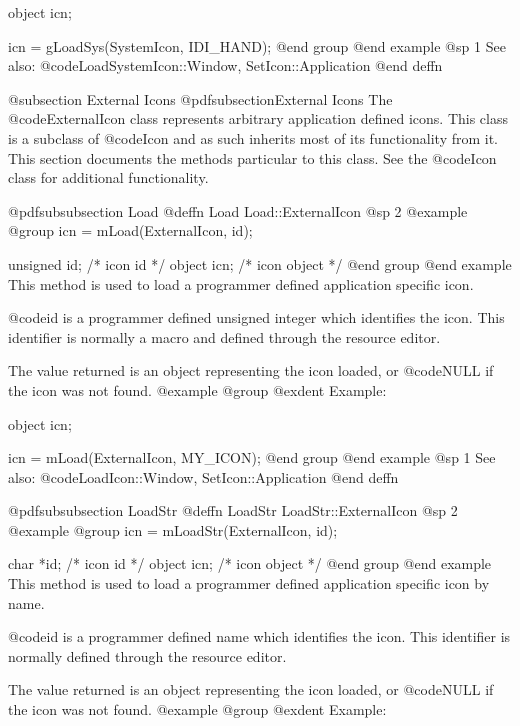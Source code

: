 object  icn;

icn = gLoadSys(SystemIcon, IDI_HAND);
@end group
@end example
@sp 1
See also:  @code{LoadSystemIcon::Window, SetIcon::Application}
@end deffn





@subsection External Icons
@pdfsubsection{External Icons}
The @code{ExternalIcon} class represents arbitrary application defined
icons.  This class is a subclass of @code{Icon} and as such inherits
most of its functionality from it.  This section documents the methods
particular to this class.  See the @code{Icon} class for additional
functionality.






@pdfsubsubsection {Load}
@deffn {Load} Load::ExternalIcon
@sp 2
@example
@group
icn = mLoad(ExternalIcon, id);

unsigned id;    /*  icon id      */
object   icn;   /*  icon object  */
@end group
@end example
This method is used to load a programmer defined application specific
icon.

@code{id} is a programmer defined unsigned integer which identifies
the icon.  This identifier is normally a macro and defined through the
resource editor.  

The value returned is an object representing the icon loaded, or
@code{NULL} if the icon was not found.
@example
@group
@exdent Example:

object  icn;

icn = mLoad(ExternalIcon, MY_ICON);
@end group
@end example
@sp 1
See also:  @code{LoadIcon::Window, SetIcon::Application}
@end deffn











@pdfsubsubsection {LoadStr}
@deffn {LoadStr} LoadStr::ExternalIcon
@sp 2
@example
@group
icn = mLoadStr(ExternalIcon, id);

char    *id;    /*  icon id      */
object   icn;   /*  icon object  */
@end group
@end example
This method is used to load a programmer defined application specific
icon by name.

@code{id} is a programmer defined name which identifies the icon.
This identifier is normally defined through the resource editor.

The value returned is an object representing the icon loaded, or
@code{NULL} if the icon was not found.
@example
@group
@exdent Example:

